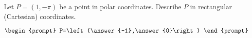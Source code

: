 \documentclass{ximera}
\author{Gregory Hartman \and Matthew Carr}
\begin{document}
\begin{exercise}





Let $P=(1,-\pi)$ be a point in polar coordinates. Describe $P$ in rectangular (Cartesian) coordinates.

\[
\begin{prompt}
P=\left(\answer{-1},\answer{0}\right)
\end{prompt}
\]

\end{exercise}
\end{document}
